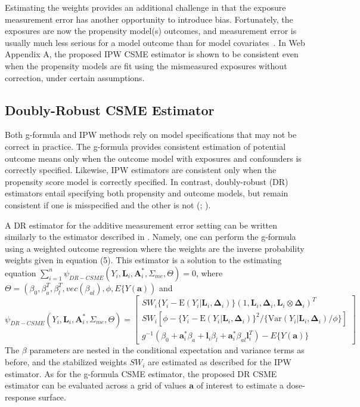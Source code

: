 \documentclass[useAMS,usenatbib,referee]{biom}
\begin{document}
Estimating the weights provides an additional challenge in that the exposure measurement error has another opportunity to introduce bias. Fortunately, the exposures are now the propensity model(s) outcomes, and measurement error is usually much less serious for a model outcome than for model covariates~\citep{carroll2006}. In Web Appendix A, the proposed IPW CSME estimator is shown to be consistent even when the propensity models are fit using the mismeasured exposures without correction, under certain assumptions.

\subsection{Doubly-Robust CSME Estimator}

Both g-formula and IPW methods rely on model specifications that may not be correct in practice. The g-formula provides consistent estimation of potential outcome means only when the outcome model with exposures and confounders is correctly specified. Likewise, IPW estimators are consistent only when the propensity score model is correctly specified. In contrast, doubly-robust (DR) estimators entail specifying both propensity and outcome models, but remain consistent if one is misspecified and the other is not (\citealp*{robins1994}; \citealp{lunceford2004,bang2005}).

A DR estimator for the additive measurement error setting can be written similarly to the estimator described in \citet{hirano2001}. Namely, one can perform the g-formula using a weighted outcome regression where the weights are the inverse probability weights given in equation (5). This estimator is a solution to the estimating equation $\sum_{i=1}^{n} \psi_{DR-CSME}(Y_{i}, \bm{L}_{i}, \bm{A}_{i}^{*}, \Sigma_{me}, \Theta) = 0$, where $\Theta = (\beta_{0}, \beta^{T}_{a}, \beta^{T}_{l}, vec(\beta_{al}), \phi, E \{ Y(\bm{a}))$ and
\begin{equation}
    \psi_{DR-CSME}(Y_{i}, \bm{L}_{i}, \bm{A}^{*}_{i}, \Sigma_{me}, \Theta) =
    \begin{bmatrix}
       SW_{i}\{ Y_{i} - \text{E}(Y_{i} | \bm{L}_{i}, \bm{\Delta}_{i}) \} (1, \bm{L}_{i}, \bm{\Delta}_{i}, \bm{L}_{i} \otimes \bm{\Delta}_{i})^{T} \\
        SW_{i}[\phi - \{ Y_{i} - \text{E}(Y_{i} | \bm{L}_{i}, \bm{\Delta}_{i}) \}^{2} / \{ \text{Var}(Y_{i} | \bm{L}_{i}, \bm{\Delta}_{i}) / \phi \}] \\
        g^{-1}(\beta_{0} + \bm{a}^{*}_{i}\beta_{a} + \bm{l}_{i}\beta_{l} +
        \bm{a}^{*}_{i}\beta_{al}\bm{l}_{i}^{T}) - E \{ Y(\bm{a}) \}
    \end{bmatrix}
\end{equation}
The $\beta$ parameters are nested in the conditional expectation and variance terms as before, and the stabilized weights $SW_{i}$ are estimated as described for the IPW estimator. As for the g-formula CSME estimator, the proposed DR CSME estimator can be evaluated across a grid of values $\bm{a}$ of interest to estimate a dose-response surface.
\end{document}
